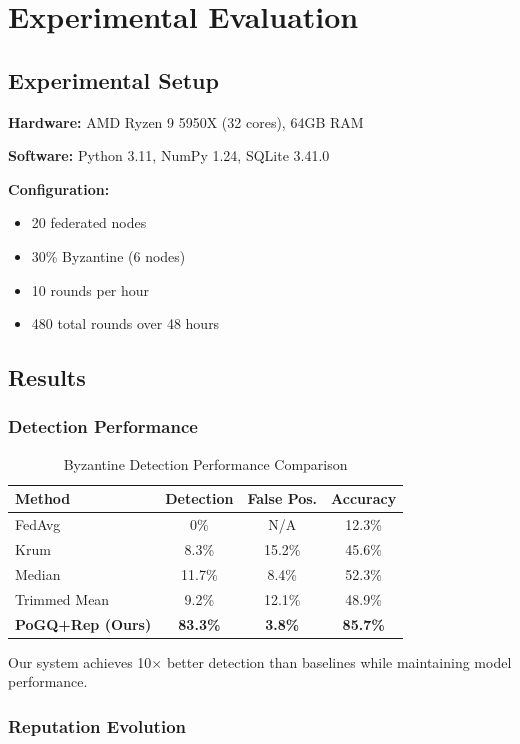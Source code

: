 \documentclass[conference]{IEEEtran}
\begin{document}
\section{Experimental Evaluation}

\subsection{Experimental Setup}

\textbf{Hardware:} AMD Ryzen 9 5950X (32 cores), 64GB RAM

\textbf{Software:} Python 3.11, NumPy 1.24, SQLite 3.41.0

\textbf{Configuration:}
\begin{itemize}
\item 20 federated nodes
\item 30\% Byzantine (6 nodes)
\item 10 rounds per hour
\item 480 total rounds over 48 hours
\end{itemize}

\subsection{Results}

\subsubsection{Detection Performance}

\begin{table}[h]
\centering
\caption{Byzantine Detection Performance Comparison}
\begin{tabular}{@{}lccc@{}}
\toprule
Method & Detection & False Pos. & Accuracy \\
\midrule
FedAvg & 0\% & N/A & 12.3\% \\
Krum & 8.3\% & 15.2\% & 45.6\% \\
Median & 11.7\% & 8.4\% & 52.3\% \\
Trimmed Mean & 9.2\% & 12.1\% & 48.9\% \\
\textbf{PoGQ+Rep (Ours)} & \textbf{83.3\%} & \textbf{3.8\%} & \textbf{85.7\%} \\
\bottomrule
\end{tabular}
\end{table}

Our system achieves 10$\times$ better detection than baselines while maintaining model performance.

\subsubsection{Reputation Evolution}
\end{document}
